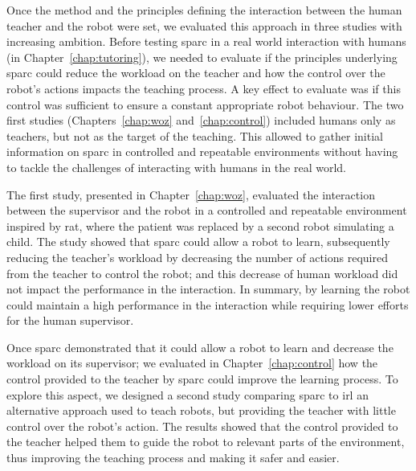 Once the method and the principles defining the interaction between the human teacher and the robot were set, we evaluated this approach in three studies with increasing ambition. Before testing \gls{sparc} in a real world interaction with humans (in Chapter~\ref{chap:tutoring}), we needed to evaluate if the principles underlying \gls{sparc} could reduce the workload on the teacher and how the control over the robot's actions impacts the teaching process. A key effect to evaluate was if this control was sufficient to ensure a constant appropriate robot behaviour. The two first studies (Chapters~\ref{chap:woz} and~\ref{chap:control}) included humans only as teachers, but not as the target of the teaching. This allowed to gather initial information on \gls{sparc} in controlled and repeatable environments without having to tackle the challenges of interacting with humans in the real world.

The first study, presented in Chapter~\ref{chap:woz}, evaluated the interaction between the supervisor and the robot in a controlled and repeatable environment inspired by \gls{rat}, where the patient was replaced by a second robot simulating a child. The study showed that \gls{sparc} could allow a robot to learn, subsequently reducing the teacher's workload by decreasing the number of actions required from the teacher to control the robot; and this decrease of human workload did not impact the performance in the interaction. In summary, by learning the robot could maintain a high performance in the interaction while requiring lower efforts for the human supervisor.

Once \gls{sparc} demonstrated that it could allow a robot to learn and decrease the workload on its supervisor; we evaluated in Chapter~\ref{chap:control} how the control provided to the teacher by \gls{sparc} could improve the learning process. To explore this aspect, we designed a second study comparing \gls{sparc} to \gls{irl} an alternative approach used to teach robots, but providing the teacher with little control over the robot's action. The results showed that the control provided to the teacher helped them to guide the robot to relevant parts of the environment, thus improving the teaching process and making it safer and easier.

